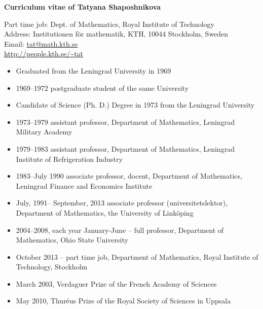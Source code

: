 \documentclass{article}
\begin{document}
\parindent=0pt
\addtolength{\parskip}{4pt}
\addtolength{\textwidth}{10em}
\addtolength{\textheight}{12em}
\def\tc{\mathaccent"7017}


\centerline{\large{\bf Curriculum vitae of Tatyana Shaposhnikova}}

\noindent
Part time job: Dept. of Mathematics, Royal Institute of Technology\\
Address: Institutionen f\"or mathematik, KTH, 10044 Stockholm, Sweden\\
Email: \href{mailto:tat@math.kth.se}{tat@math.kth.se}\\
\url{http://people.kth.se/~tat}


\begin{itemize}
         \item Graduated from the Leningrad University in 1969
         \item 1969--1972 postgraduate student of the same University
         \item Candidate of Science (Ph. D.) Degree in 1973 from the
Leningrad University
\end{itemize}

\begin{itemize}
         \item 1973--1979  assistant professor, Department of
Mathematics, Leningrad
          Military Academy
         \item 1979--1983  assistant professor, Department of
Mathematics, Leningrad
          Institute of Refrigeration Industry
          \item 1983--July 1990  associate professor, docent,
Department of Mathematics, Leningrad Finance
         and Economics Institute
          \item  July, 1991-- September, 2013   associate professor
(universitetslektor), Department of Mathematics, the
         University of Link\"oping
         \item 2004--2008, each year January-June -- full professor, Department of Mathematics, Ohio State University
        \item October 2013 -- part time job,  Department of Mathematics, Royal Institute of Technology, Stockholm

\end{itemize}

\begin{itemize}
         \item March 2003, Verdaguer Prize of the French Academy of Sciences
         \item May 2010, Thur\'eus Prize of the Royal Society of Sciences in Uppsala
\end{itemize}
\end{document}

